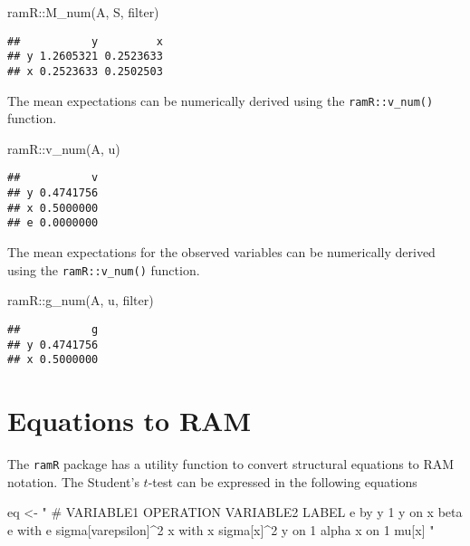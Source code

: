 \documentclass[
]{book}
\newenvironment{Shaded}{\begin{snugshade}}{\end{snugshade}}
\newcommand{\FunctionTok}[1]{\textcolor[rgb]{0.00,0.00,0.00}{#1}}
\newcommand{\NormalTok}[1]{#1}
\newcommand{\OtherTok}[1]{\textcolor[rgb]{0.56,0.35,0.01}{#1}}
\newcommand{\SpecialCharTok}[1]{\textcolor[rgb]{0.00,0.00,0.00}{#1}}
\newcommand{\StringTok}[1]{\textcolor[rgb]{0.31,0.60,0.02}{#1}}
\theoremstyle{definition}
\theoremstyle{definition}
\theoremstyle{definition}
\theoremstyle{remark}
\begin{document}
\begin{Shaded}
\begin{Highlighting}[]
\NormalTok{ramR}\SpecialCharTok{::}\FunctionTok{M\_num}\NormalTok{(A, S, filter)}
\end{Highlighting}
\end{Shaded}

\begin{verbatim}
##           y         x
## y 1.2605321 0.2523633
## x 0.2523633 0.2502503
\end{verbatim}

The mean expectations
can be numerically derived using the \texttt{ramR::v\_num()} function.

\begin{Shaded}
\begin{Highlighting}[]
\NormalTok{ramR}\SpecialCharTok{::}\FunctionTok{v\_num}\NormalTok{(A, u)}
\end{Highlighting}
\end{Shaded}

\begin{verbatim}
##           v
## y 0.4741756
## x 0.5000000
## e 0.0000000
\end{verbatim}

The mean expectations for the observed variables
can be numerically derived using the \texttt{ramR::v\_num()} function.

\begin{Shaded}
\begin{Highlighting}[]
\NormalTok{ramR}\SpecialCharTok{::}\FunctionTok{g\_num}\NormalTok{(A, u, filter)}
\end{Highlighting}
\end{Shaded}

\begin{verbatim}
##           g
## y 0.4741756
## x 0.5000000
\end{verbatim}

\hypertarget{equations-to-ram}{%
\section{Equations to RAM}\label{equations-to-ram}}

The \texttt{ramR} package has a utility function
to convert structural equations to RAM notation.
The Student's \(t\)-test can be expressed in the following equations

\begin{Shaded}
\begin{Highlighting}[]
\NormalTok{eq }\OtherTok{\textless{}{-}} \StringTok{"}
\StringTok{  \# VARIABLE1 OPERATION VARIABLE2 LABEL}
\StringTok{  e           by        y         1}
\StringTok{  y           on        x         beta}
\StringTok{  e           with      e         sigma[varepsilon]\^{}2}
\StringTok{  x           with      x         sigma[x]\^{}2}
\StringTok{  y           on        1         alpha}
\StringTok{  x           on        1         mu[x]}
\StringTok{"}
\end{Highlighting}
\end{Shaded}
\end{document}
